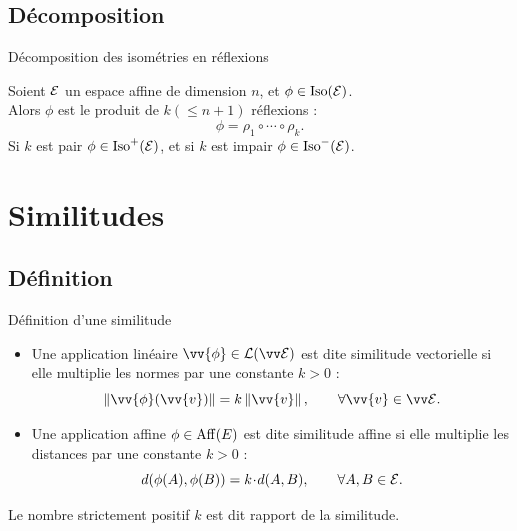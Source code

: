 \documentclass[bigger]{m53beamer}
\begin{document}
\subsection{Décomposition}
\begin{frame}{Décomposition des isométries en réflexions}
  \pause
  \begin{proposition}
    Soient $\mathcal{E}$ un espace affine de dimension $n$, et $\phi \in \operatorname{Iso}(\mathcal{E})$.\pause\\
    Alors $\phi$ est le produit de $k (\leq n+1)$ réflexions :
    \[
      \phi = \rho_{1}\circ\cdots\circ\rho_{k}.
    \]\pause
    Si $k$ est pair $\phi \in \operatorname{Iso}^{+}(\mathcal{E})$, et si $k$ est impair $\phi \in \operatorname{Iso}^{-}(\mathcal{E})$.
  \end{proposition}
\end{frame}

\section{Similitudes}

\subsection{Définition}
\begin{frame}{Définition d'une similitude}
  \begin{definition}
    \begin{itemize}[<+(1)->]
      \item Une application linéaire $\vv{\phi} \in \lin(\ev{E})$ est dite \alert{similitude vectorielle} si elle multiplie les normes par une constante $k > 0$ :
      \[
          \norm{\vv{\phi}(\vv{v})} = k\norm{\vv{v}},\qquad \forall \vv{v} \in \ev{E}.
      \]
      \item Une application affine $\phi  \in \operatorname{Aff}(E)$ est dite \alert{similitude affine} si elle multiplie les distances par une constante $k > 0$ :
      \[
          d(\phi(A),\phi(B)) = k\!\cdot\!d(A,B),\qquad \forall A,B \in \mathcal{E}.
      \]
    \end{itemize}\pause
    Le nombre strictement positif $k$ est dit \alert{rapport de la similitude}.
  \end{definition}
\end{frame}
\end{document}
